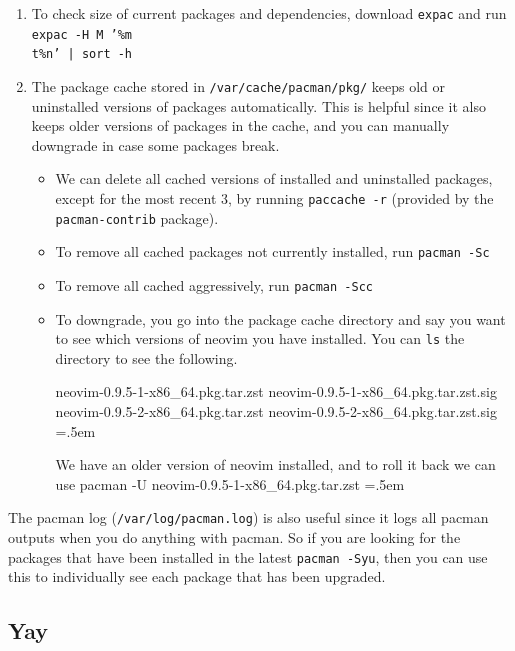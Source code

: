 \documentclass{article}
\newenvironment{cverbatim}
    {\SaveVerbatim{cverb}}
    {\endSaveVerbatim
    \flushleft\fboxrule=0pt\fboxsep=.5em
    \colorbox{cverbbg}{%
      \makebox[\dimexpr\linewidth-2\fboxsep][l]{\BUseVerbatim{cverb}}%
    }
    \endflushleft
  }
\begin{document}
\begin{enumerate}
      \item To check size of current packages and dependencies, download \texttt{expac} and run \texttt{expac -H M '\%m \\t\%n' | sort -h} 

      \item The package cache stored in \texttt{/var/cache/pacman/pkg/} keeps old or uninstalled versions of packages automatically. This is helpful since it also keeps older versions of packages in the cache, and you can manually downgrade in case some packages break.  
      \begin{itemize}
        \item We can delete all cached versions of installed and uninstalled packages, except for the most recent 3, by running \texttt{paccache -r} (provided by the \texttt{pacman-contrib} package). 
        \item To remove all cached packages not currently installed, run \texttt{pacman -Sc}
        \item To remove all cached aggressively, run \texttt{pacman -Scc}
        \item To downgrade, you go into the package cache directory and say you want to see which versions of neovim you have installed. You can \texttt{ls} the directory to see the following. 
        
          \begin{cverbatim}
            neovim-0.9.5-1-x86_64.pkg.tar.zst
            neovim-0.9.5-1-x86_64.pkg.tar.zst.sig
            neovim-0.9.5-2-x86_64.pkg.tar.zst
            neovim-0.9.5-2-x86_64.pkg.tar.zst.sig
          \end{cverbatim}

          We have an older version of neovim installed, and to roll it back we can use 
          \begin{cverbatim} 
            pacman -U neovim-0.9.5-1-x86_64.pkg.tar.zst
          \end{cverbatim}
      \end{itemize} 
    \end{enumerate}

    The pacman log (\texttt{/var/log/pacman.log}) is also useful since it logs all pacman outputs when you do anything with pacman. So if you are looking for the packages that have been installed in the latest \texttt{pacman -Syu}, then you can use this to individually see each package that has been upgraded. 


  \subsection{Yay}
\end{document}
